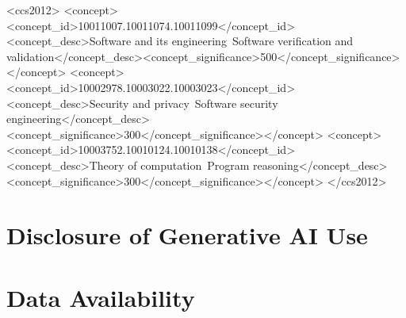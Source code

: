 \documentclass[acmsmall,screen,review,anonymous]{acmart}
\begin{document}
\begin{CCSXML}
<ccs2012>
<concept><concept_id>10011007.10011074.10011099</concept_id><concept_desc>Software and its engineering~Software verification and validation</concept_desc><concept_significance>500</concept_significance></concept>
<concept><concept_id>10002978.10003022.10003023</concept_id><concept_desc>Security and privacy~Software security engineering</concept_desc><concept_significance>300</concept_significance></concept>
<concept><concept_id>10003752.10010124.10010138</concept_id><concept_desc>Theory of computation~Program reasoning</concept_desc><concept_significance>300</concept_significance></concept>
</ccs2012>
\end{CCSXML}

\maketitle










\section*{Disclosure of Generative AI Use}


\section*{Data Availability}





\appendix

\end{document}
